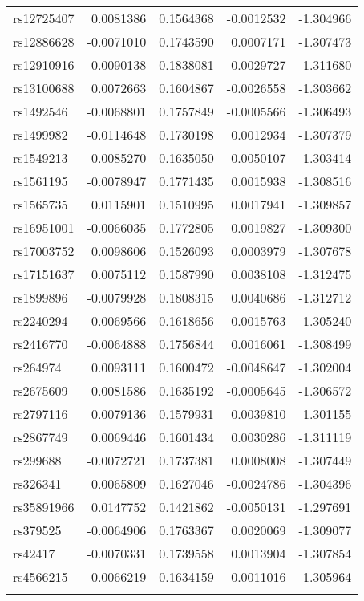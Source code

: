 \documentclass[
]{article}
\theoremstyle{plain}
\begin{document}
\begin{longtable}[t]{lrrrr}
\addlinespace
rs12725407 & 0.0081386 & 0.1564368 & -0.0012532 & -1.304966\\
rs12886628 & -0.0071010 & 0.1743590 & 0.0007171 & -1.307473\\
rs12910916 & -0.0090138 & 0.1838081 & 0.0029727 & -1.311680\\
rs13100688 & 0.0072663 & 0.1604867 & -0.0026558 & -1.303662\\
rs1492546 & -0.0068801 & 0.1757849 & -0.0005566 & -1.306493\\
\addlinespace
rs1499982 & -0.0114648 & 0.1730198 & 0.0012934 & -1.307379\\
rs1549213 & 0.0085270 & 0.1635050 & -0.0050107 & -1.303414\\
rs1561195 & -0.0078947 & 0.1771435 & 0.0015938 & -1.308516\\
rs1565735 & 0.0115901 & 0.1510995 & 0.0017941 & -1.309857\\
rs16951001 & -0.0066035 & 0.1772805 & 0.0019827 & -1.309300\\
\addlinespace
rs17003752 & 0.0098606 & 0.1526093 & 0.0003979 & -1.307678\\
rs17151637 & 0.0075112 & 0.1587990 & 0.0038108 & -1.312475\\
rs1899896 & -0.0079928 & 0.1808315 & 0.0040686 & -1.312712\\
rs2240294 & 0.0069566 & 0.1618656 & -0.0015763 & -1.305240\\
rs2416770 & -0.0064888 & 0.1756844 & 0.0016061 & -1.308499\\
\addlinespace
rs264974 & 0.0093111 & 0.1600472 & -0.0048647 & -1.302004\\
rs2675609 & 0.0081586 & 0.1635192 & -0.0005645 & -1.306572\\
rs2797116 & 0.0079136 & 0.1579931 & -0.0039810 & -1.301155\\
rs2867749 & 0.0069446 & 0.1601434 & 0.0030286 & -1.311119\\
rs299688 & -0.0072721 & 0.1737381 & 0.0008008 & -1.307449\\
\addlinespace
rs326341 & 0.0065809 & 0.1627046 & -0.0024786 & -1.304396\\
rs35891966 & 0.0147752 & 0.1421862 & -0.0050131 & -1.297691\\
rs379525 & -0.0064906 & 0.1763367 & 0.0020069 & -1.309077\\
rs42417 & -0.0070331 & 0.1739558 & 0.0013904 & -1.307854\\
rs4566215 & 0.0066219 & 0.1634159 & -0.0011016 & -1.305964\\
\addlinespace

\end{longtable}
\end{document}
